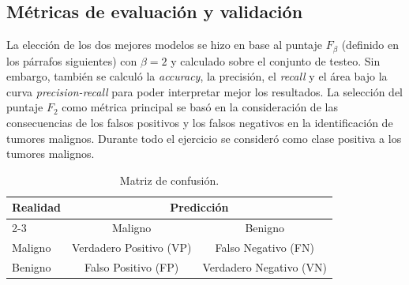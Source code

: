 \subsection{Métricas de evaluación y validación}\label{sec:metricas}


La elección de los dos mejores modelos se hizo en base al puntaje $F_\beta$
(definido en los párrafos siguientes) con $\beta = 2$ y calculado sobre el
conjunto de testeo. Sin embargo, también se calculó la \textit{accuracy}, la
precisión, el \textit{recall} y el área bajo la curva \textit{precision-recall}
para poder interpretar mejor los resultados. La selección del puntaje $F_2$
como métrica principal se basó en la consideración de las consecuencias de los
falsos positivos y los falsos negativos en la identificación de tumores
malignos. Durante todo el ejercicio se consideró como clase positiva a los
tumores malignos.

\begin{table}[h]
\begin{tabular*}{\textwidth}[t]{@{\extracolsep{\fill}}lcc}
\toprule
\multirow{2}{3em}{Realidad}  & \multicolumn{2}{c}{Predicción} \\
            \cmidrule{2-3}
          & Maligno                 & Benigno \\
\midrule
Maligno   & Verdadero Positivo (VP) & Falso Negativo (FN) \\
Benigno   & Falso Positivo (FP)     & Verdadero Negativo (VN) \\
\bottomrule
\end{tabular*}
\caption{Matriz de confusión.}
\label{tab:confusion}
\end{table}

